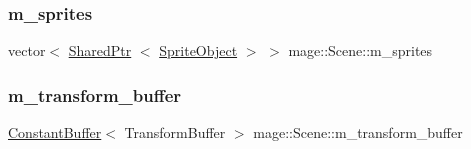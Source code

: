 \subsubsection{\texorpdfstring{m\+\_\+sprites}{m\_sprites}}
{\footnotesize\ttfamily vector$<$ \hyperlink{namespacemage_a1e01ae66713838a7a67d30e44c67703e}{Shared\+Ptr} $<$ \hyperlink{classmage_1_1_sprite_object}{Sprite\+Object} $>$ $>$ mage\+::\+Scene\+::m\+\_\+sprites\hspace{0.3cm}{\ttfamily [private]}}

\hypertarget{classmage_1_1_scene_a2e57c981725d0a64bfc8f82381ac3d6a}{}\label{classmage_1_1_scene_a2e57c981725d0a64bfc8f82381ac3d6a} 
\subsubsection{\texorpdfstring{m\+\_\+transform\+\_\+buffer}{m\_transform\_buffer}}
{\footnotesize\ttfamily \hyperlink{structmage_1_1_constant_buffer}{Constant\+Buffer}$<$ Transform\+Buffer $>$ mage\+::\+Scene\+::m\+\_\+transform\+\_\+buffer\hspace{0.3cm}{\ttfamily [private]}}

